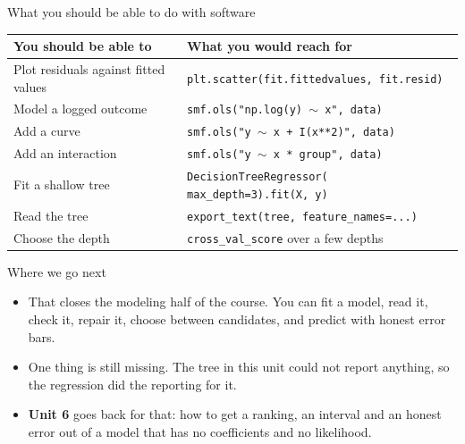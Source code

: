 \documentclass[aspectratio=169]{beamer}
\begin{document}
\begin{frame}{What you should be able to do with software}
\small
\begin{center}\footnotesize
\begin{tabular}{p{} p{}}
\toprule
\textbf{You should be able to} & \textbf{What you would reach for} \\
\midrule
Plot residuals against fitted values & \texttt{plt.scatter(fit.fittedvalues, fit.resid)} \\
Model a logged outcome & \texttt{smf.ols("np.log(y) $\sim$ x", data)} \\
Add a curve & \texttt{smf.ols("y $\sim$ x + I(x**2)", data)} \\
Add an interaction & \texttt{smf.ols("y $\sim$ x * group", data)} \\
Fit a shallow tree & \texttt{DecisionTreeRegressor(} \newline
\texttt{\phantom{xx}max\_depth=3).fit(X, y)} \\
Read the tree & \texttt{export\_text(tree, feature\_names=...)} \\
Choose the depth & \texttt{cross\_val\_score} over a few depths \\
\bottomrule
\end{tabular}
\end{center}
\end{frame}

\begin{frame}{Where we go next}
\begin{itemize}
  \item That closes the modeling half of the course. You can fit a model, read it, check it,
        repair it, choose between candidates, and predict with honest error bars.
  \item One thing is still missing. The tree in this unit could not report anything, so the
        regression did the reporting for it.
  \item \textbf{Unit 6} goes back for that: how to get a ranking, an interval and an honest error
        out of a model that has no coefficients and no likelihood.
\end{itemize}
\end{frame}
\end{document}

